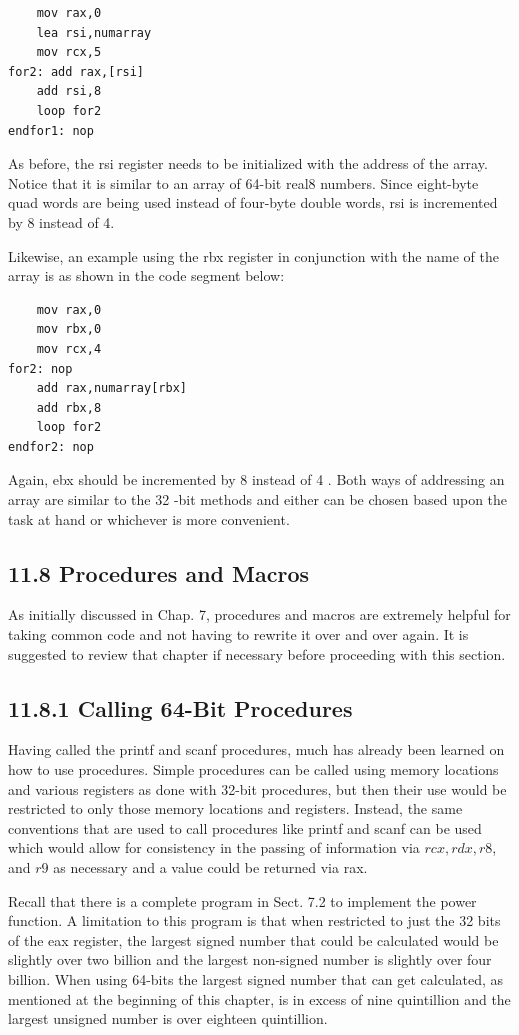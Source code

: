 \documentclass[10pt]{book}
\begin{document}
\begin{center}
\begin{center}
\begin{center}
\begin{center}
\begin{verbatim}
    mov rax,0
    lea rsi,numarray
    mov rcx,5
for2: add rax,[rsi]
    add rsi,8
    loop for2
endfor1: nop
\end{verbatim}

As before, the rsi register needs to be initialized with the address of the array. Notice that it is similar to an array of 64-bit real8 numbers. Since eight-byte quad words are being used instead of four-byte double words, rsi is incremented by 8 instead of 4.

Likewise, an example using the rbx register in conjunction with the name of the array is as shown in the code segment below:

\begin{verbatim}
    mov rax,0
    mov rbx,0
    mov rcx,4
for2: nop
    add rax,numarray[rbx]
    add rbx,8
    loop for2
endfor2: nop
\end{verbatim}

Again, ebx should be incremented by 8 instead of 4 . Both ways of addressing an array are similar to the 32 -bit methods and either can be chosen based upon the task at hand or whichever is more convenient.

\subsection*{11.8 Procedures and Macros}
As initially discussed in Chap. 7, procedures and macros are extremely helpful for taking common code and not having to rewrite it over and over again. It is suggested to review that chapter if necessary before proceeding with this section.

\subsection*{11.8.1 Calling 64-Bit Procedures}
Having called the printf and scanf procedures, much has already been learned on how to use procedures. Simple procedures can be called using memory locations and various registers as done with 32-bit procedures, but then their use would be restricted to only those memory locations and registers. Instead, the same conventions that are used to call procedures like printf and scanf can be used which would allow for consistency in the passing of information via $r c x, r d x, r 8$, and $r 9$ as necessary and a value could be returned via rax.


Recall that there is a complete program in Sect. 7.2 to implement the power function. A limitation to this program is that when restricted to just the 32 bits of the eax register, the largest signed number that could be calculated would be slightly over two billion and the largest non-signed number is slightly over four billion. When using 64-bits the largest signed number that can get calculated, as mentioned at the beginning of this chapter, is in excess of nine quintillion and the largest unsigned number is over eighteen quintillion.


\end{center}
\end{center}
\end{center}
\end{center}
\end{document}
